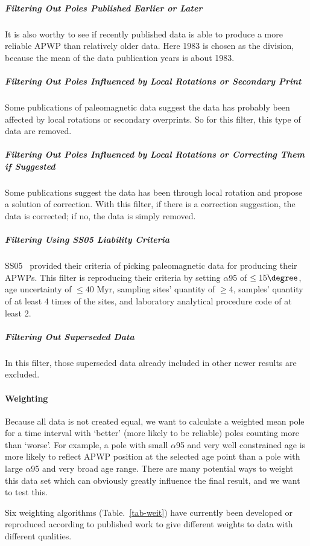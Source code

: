 \subparagraph{Filtering Out Poles Published Earlier or Later}

It is also worthy to see if recently published data is able to produce a more
reliable APWP than relatively older data. Here 1983 is chosen as the division,
because the mean of the data publication years is about 1983.

\subparagraph{Filtering Out Poles Influenced by Local Rotations or Secondary
Print}

Some publications of paleomagnetic data suggest the data has probably been
affected by local rotations or secondary overprints. So for this filter, this
type of data are removed.

\subparagraph{Filtering Out Poles Influenced by Local Rotations or Correcting
Them if Suggested}

Some publications suggest the data has been through local rotation and propose a
solution of correction. With this filter, if there is a correction suggestion,
the data is corrected; if no, the data is simply removed.

\subparagraph{Filtering Using SS05 Liability Criteria}

SS05~\cite{S05} provided their criteria of picking paleomagnetic data for
producing their APWPs. This filter is reproducing their criteria by setting
$\alpha$95 of $\leq15\degree$, age uncertainty of $\leq40$ Myr, sampling sites'
quantity of $\geq4$, samples' quantity of at least 4 times of the sites, and
laboratory analytical procedure code of at least 2.

\subparagraph{Filtering Out Superseded Data}

In this filter, those superseded data already included in other newer results
are excluded.

\paragraph{Weighting}

Because all data is not created equal, we want to calculate a weighted mean pole
for a time interval with `better' (more likely to be reliable) poles counting
more than `worse'. For example, a pole with small $\alpha$95 and very well
constrained age is more likely to reflect APWP position at the selected age
point than a pole with large $\alpha$95 and very broad age range. There are many
potential ways to weight this data set which can obviously greatly influence the
final result, and we want to test this.

Six weighting algorithms (Table.~\ref{tab-weit}) have currently been developed
or reproduced according to published work to give different weights to data with
different qualities.

